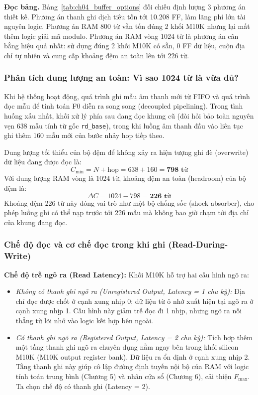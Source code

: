 \textbf{Đọc bảng.} Bảng~\ref{tab:ch04_buffer_options} đối chiếu định lượng 3 phương án thiết kế. Phương án thanh ghi dịch tiêu tốn tới 10.208 FF, làm lãng phí lớn tài nguyên logic. Phương án RAM 800 từ vẫn tốn đúng 2 khối M10K nhưng lại mất thêm logic giải mã modulo. Phương án RAM vòng 1024 từ là phương án cân bằng hiệu quả nhất: sử dụng đúng 2 khối M10K có sẵn, 0 FF dữ liệu, cuộn địa chỉ tự nhiên và cung cấp khoảng đệm an toàn lên tới 226 từ.

\subsubsection*{Phân tích dung lượng an toàn: Vì sao 1024 từ là vừa đủ?}
Khi hệ thống hoạt động, quá trình ghi mẫu âm thanh mới từ FIFO và quá trình đọc mẫu để tính toán F0 diễn ra song song (decoupled pipelining). Trong tình huống xấu nhất, khối xử lý phía sau đang đọc khung cũ (đòi hỏi bảo toàn nguyên vẹn 638 mẫu tính từ gốc \texttt{rd\_base}), trong khi luồng âm thanh đầu vào liên tục ghi thêm 160 mẫu mới của bước nhảy hop tiếp theo.

Dung lượng tối thiểu của bộ đệm để không xảy ra hiện tượng ghi đè (overwrite) dữ liệu đang được đọc là:
\begin{equation}
C_{\min} = N + \text{hop} = 638 + 160 = \mathbf{798\text{ từ}}
\end{equation}
Với dung lượng RAM vòng là $1024\text{ từ}$, khoảng đệm an toàn (headroom) của bộ đệm là:
\begin{equation}
\Delta C = 1024 - 798 = \mathbf{226\text{ từ}}
\end{equation}
Khoảng đệm 226 từ này đóng vai trò như một bộ chống sốc (shock absorber), cho phép luồng ghi có thể nạp trước tới 226 mẫu mà không bao giờ chạm tới địa chỉ của khung đang đọc.

\subsubsection*{Chế độ đọc và cơ chế đọc trong khi ghi (Read-During-Write)}
\textbf{Chế độ trễ ngõ ra (Read Latency):}
Khối M10K hỗ trợ hai cấu hình ngõ ra:
\begin{itemize}[leftmargin=1.5em, itemsep=2pt]
    \item \emph{Không có thanh ghi ngõ ra (Unregistered Output, Latency = 1 chu kỳ):} Địa chỉ đọc được chốt ở cạnh xung nhịp 0; dữ liệu từ ô nhớ xuất hiện tại ngõ ra ở cạnh xung nhịp 1. Cấu hình này giảm trễ đọc đi 1 nhịp, nhưng ngõ ra nối thẳng từ lõi nhớ vào logic kết hợp bên ngoài.
    \item \emph{Có thanh ghi ngõ ra (Registered Output, Latency = 2 chu kỳ):} Tích hợp thêm một tầng thanh ghi ngõ ra chuyên dụng nằm ngay bên trong khối silicon M10K (M10K output register bank). Dữ liệu ra ổn định ở cạnh xung nhịp 2. Tầng thanh ghi này giúp cô lập đường định tuyến nội bộ của RAM với logic tính toán trung bình (Chương 5) và nhân cửa sổ (Chương 6), cải thiện $F_{\max}$. Ta chọn chế độ có thanh ghi (Latency = 2).
\end{itemize}

